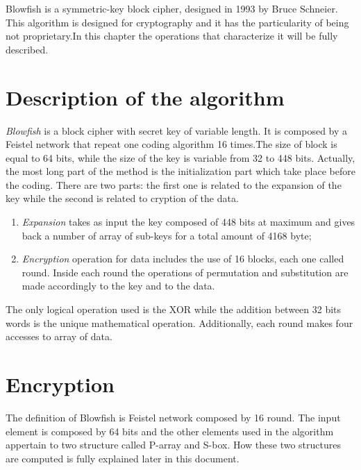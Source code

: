 
Blowfish is a symmetric-key block cipher, designed in 1993 by Bruce Schneier. This algorithm is designed for cryptography and it has the particularity of being not proprietary.\newline In this chapter the operations that characterize it will be fully described.
\section{Description of the algorithm}
\textit{Blowfish} is a block cipher with secret key of variable length. It is composed by a Feistel network that repeat one coding algorithm 16 times.The size of block is equal to 64 bits, while the size of the key is variable from 32 to 448 bits. Actually, the most long part of the method is the initialization part which take place before the coding.\newline
There are two parts: the first one is related to the expansion of the key while the second is related to cryption of the data.
\begin{enumerate}
 \item \textit{Expansion} takes as input the key composed of 448 bits at maximum and gives back a number of array of sub-keys for a total amount of 4168 byte;
 \item \textit{Encryption} operation for data includes the use of 16 blocks, each one called round. Inside each round the operations of permutation and substitution are made accordingly to the key and to the data.
 \end{enumerate}
The only logical operation used is the XOR while the addition between 32 bits words is the unique mathematical operation. Additionally, each round makes four accesses to array of data.
\section{Encryption}

The definition of Blowfish is Feistel network composed by 16 round. The input element is composed by 64 bits and the other elements used in the algorithm appertain to two structure called P-array and S-box. How these two structures are computed is fully explained later in this document.\newpage

